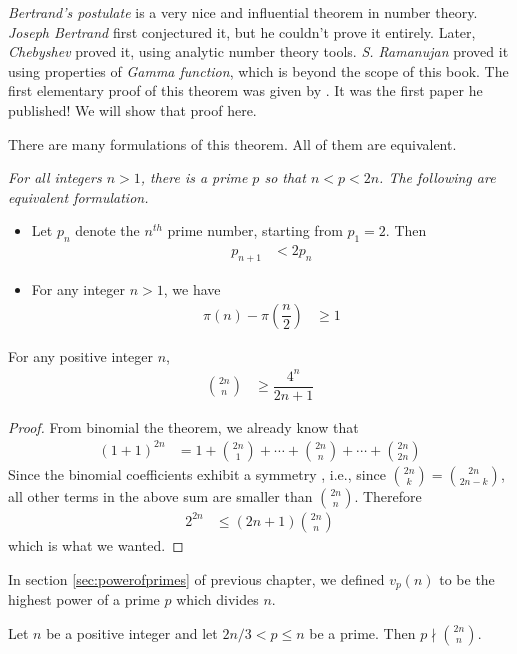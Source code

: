 \documentclass{subfile}
\begin{document}
	\label{sec:bertrandspostulate}
	\textit{Bertrand's postulate} is a very nice and influential theorem in number theory. \textit{Joseph Bertrand} first conjectured it, but he couldn't prove it entirely. Later, \textit{Chebyshev} proved it, using analytic number theory tools. \textit{S. Ramanujan} \textcite{meher_murty_2013} proved it using properties of \textit{Gamma function}, which is beyond the scope of this book. The first elementary proof of this theorem was given by \textcite{erdos_1932}. It was the first paper he published! We will show that proof here.

	There are many formulations of this theorem. All of them are equivalent.

	\begin{theorem}\label{thm:bertrand}\slshape
		For all integers $n>1$, there is a prime $p$ so that $n<p<2n$. The following are equivalent formulation.
		\begin{itemize}
			\item Let $p_n$ denote the $n^{th}$ prime number, starting from $p_1=2$. Then
			\begin{align*}
				p_{n+1}
					& <2p_n
			\end{align*}
			\item For any integer $n >1$, we have
			\begin{align*}
				\pi(n)-\pi\left(\dfrac{n}{2}\right)
					& \geq1
			\end{align*}
		\end{itemize}
	\end{theorem}

	\begin{lemma}\label{lem:bertrand1}
		For any positive integer $n$,
			\begin{align*}
				\binom{2n}{n}
					& \geq\dfrac{4^n}{2n+1}
			\end{align*}
	\end{lemma}

	\begin{proof}
		From binomial the theorem, we already know that
		\begin{align*}
			(1+1)^{2n}
				& = 1+\binom{2n}1+\cdots+\binom{2n}{n}+\cdots+\binom{2n}{2n}
		\end{align*}
		Since the binomial coefficients exhibit a symmetry , i.e., since $\binom{2n}{k}=\binom{2n}{2n-k}$, all other terms in the above sum are smaller than $\binom{2n}{n}$. Therefore
			\begin{align*}
				2^{2n}
					& \leq(2n+1)\binom{2n}n
			\end{align*}
		which is what we wanted.

	\end{proof}
	In section \eqref{sec:powerofprimes} of previous chapter, we defined $v_p(n)$ to be the highest power of a prime $p$ which divides $n$.
	\begin{lemma}\label{lem:bertrand2}
		Let $n$ be a positive integer and let $2n/3<p\leq n$ be a prime. Then $p \nmid \binom{2n}n$.
	\end{lemma}
\end{document}
